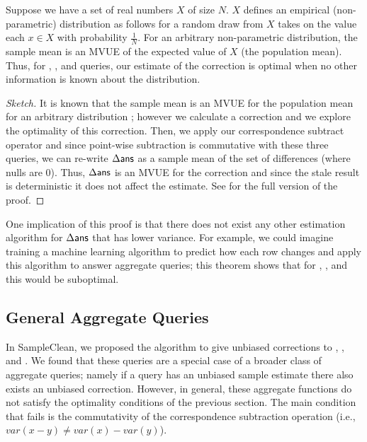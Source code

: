 \begin{theorem}
Suppose we have a set of real numbers $X$ of size $N$. 
$X$ defines an empirical (non-parametric) distribution as follows for a random draw from $X$ takes on the value each $x \in X$ with probability $\frac{1}{N}$.
For an arbitrary non-parametric distribution, the sample mean is an MVUE of the expected value of $X$ (the population mean).
Thus, for \sumfunc, \countfunc, and \avgfunc queries, our estimate of the correction is optimal when no other information is known about the distribution. 
\end{theorem}

\begin{proof}[Sketch]
It is known that the sample mean is an MVUE for the population mean for an arbitrary distribution \cite{shuster1982nonparametric}; however we calculate a correction and we explore the optimality of this correction.
Then, we apply our correspondence subtract operator and since point-wise subtraction is commutative with these three queries,
we can re-write $\Delta\textsf{ans}$ as a sample mean of the set of differences (where nulls are 0).
Thus, $\Delta\textsf{ans}$ is an MVUE for the correction and since the stale result is deterministic it does not affect the estimate.
See \cite{technicalReport} for the full version of the proof.
\end{proof}

One implication of this proof is that there does not exist any other estimation algorithm for $\Delta\textsf{ans}$ that has lower variance.
For example, we could imagine training a machine learning algorithm to predict how each row changes and apply this algorithm to answer aggregate queries; this theorem shows that for \sumfunc, \countfunc, and \avgfunc this would be suboptimal.

\subsection{General Aggregate Queries}
In SampleClean, we proposed the \nsc algorithm to give unbiased corrections to \sumfunc, \countfunc, and \avgfunc.
We found that these queries are a special case of a broader class of aggregate queries; namely if a query has an unbiased sample estimate there also exists an unbiased correction.
However, in general, these aggregate functions do not satisfy the optimality conditions of the previous section.
The main condition that fails is the commutativity of the correspondence subtraction operation (i.e., $var(x-y) \ne var(x) - var(y)$).

